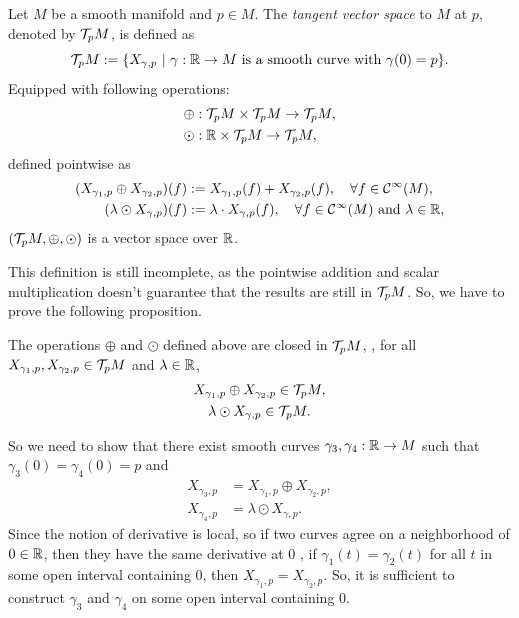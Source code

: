 \begin{definition}
	Let \(M\) be a smooth manifold and \(p \in M\). The \emph{tangent vector space} to \(M\) at \(p\), denoted by \(\mathcal T_p M\), is defined as
	\begin{equation}
		\mathcal T_p M := \qty{X_{\gamma, p} \ \middle|\ \gamma: \mathbb R\to M \text{ is a smooth curve with } \gamma(0) = p}.
	\end{equation}
	Equipped with following operations:
	\begin{align*}
		 & \oplus: \mathcal T_p M \times \mathcal T_p M \to \mathcal T_p M, \\
		 & \odot:  \mathbb R \times \mathcal T_p M \to \mathcal T_p M,
	\end{align*}
	defined pointwise as
	\begin{align*}
		(X_{\gamma_1, p} \oplus X_{\gamma_2, p})(f) & := X_{\gamma_1, p}(f) + X_{\gamma_2, p}(f), \quad \forall f \in \mathcal C^\infty(M),                    \\
		(\lambda \odot X_{\gamma, p})(f)            & := \lambda \cdot X_{\gamma, p}(f), \quad \forall f \in \mathcal C^\infty(M) \text{ and } \lambda \in \mathbb R,
	\end{align*}
	\(\qty(\mathcal T_p M, \oplus, \odot)\) is a vector space over \(\mathbb R\).
\end{definition}
This definition is still incomplete, as the pointwise addition and scalar multiplication doesn't guarantee that the results are still in \(\mathcal T_p M\). So, we have to prove the following proposition.
\begin{proposition}
	The operations \(\oplus\) and \(\odot\) defined above are closed in \(\mathcal T_p M\), \ie, for all \(X_{\gamma_1, p}, X_{\gamma_2, p} \in \mathcal T_p M\) and \(\lambda \in \mathbb R\),
	\begin{gather}
		X_{\gamma_1, p} \oplus X_{\gamma_2, p} \in \mathcal T_p M, \\
		\lambda \odot X_{\gamma, p}            \in \mathcal T_p M.
	\end{gather}
\end{proposition}
So we need to show that there exist smooth curves \(\gamma_3, \gamma_4: \mathbb R \to M\) such that \(\gamma_3(0) = \gamma_4(0) = p\) and
\begin{align*}
	X_{\gamma_3, p} & = X_{\gamma_1, p} \oplus X_{\gamma_2, p}, \\
	X_{\gamma_4, p} & = \lambda \odot X_{\gamma, p}.
\end{align*}
Since the notion of derivative is local, so if two curves agree on a neighborhood of \(0 \in \mathbb R\), then they have the same derivative at \(0\) \ie, if \(\gamma_1(t) = \gamma_2(t)\) for all \(t\) in some open interval containing \(0\), then \(X_{\gamma_1, p} = X_{\gamma_2, p}\). So, it is sufficient to construct \(\gamma_3\) and \(\gamma_4\) on some open interval containing \(0\).
